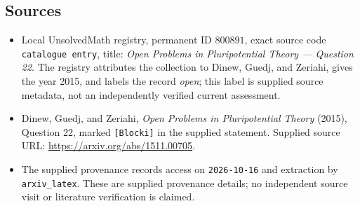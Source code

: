 \documentclass[11pt]{article}
\begin{document}
\subsection{Sources}
\begin{itemize}
\item Local UnsolvedMath registry, permanent ID \(800891\), exact source code \texttt{catalogue entry}, title: \emph{Open Problems in Pluripotential Theory --- Question 22}. The registry attributes the collection to Dinew, Guedj, and Zeriahi, gives the year 2015, and labels the record \emph{open}; this label is supplied source metadata, not an independently verified current assessment.
\item Dinew, Guedj, and Zeriahi, \emph{Open Problems in Pluripotential Theory} (2015), Question 22, marked \texttt{[Blocki]} in the supplied statement. Supplied source URL: \url{https://arxiv.org/abs/1511.00705}.
\item The supplied provenance records access on \texttt{2026-10-16} and extraction by \texttt{arxiv\_latex}. These are supplied provenance details; no independent source visit or literature verification is claimed.
\end{itemize}
\end{document}

